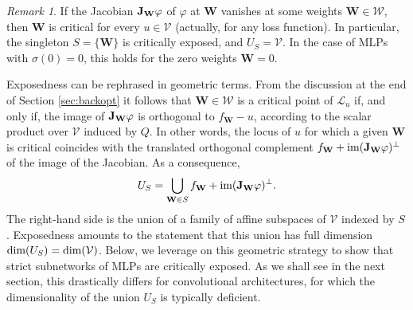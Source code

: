 \documentclass{article} %
\theoremstyle{plain}%
\theoremstyle{definition}
\theoremstyle{remark}
\newtheorem{rmk}{Remark}[section]
\newcommand{\jacob}{\textnormal{\textbf{J}}}
\begin{document}
\begin{rmk}\label{rem:vanexp}
If the Jacobian $\jacob_\mathbf{W}\varphi$  of $\varphi$ at $\mathbf{W}$  vanishes at some weights $\mathbf{W} \in \mathcal{W}$, then $\mathbf{W}$ is critical for every $u \in \mathcal{V}$ (actually, for any loss function). In particular, the singleton $S = \{ \mathbf{W} \}$ is critically exposed, and $U_S = \mathcal{V}$. In the case of MLPs with $\sigma(0) = 0$, this holds for the zero weights $\mathbf{W} = 0$.
\end{rmk}
Exposedness can be rephrased in geometric terms. From the discussion at the end of Section \ref{sec:backopt} it follows that $\mathbf{W} \in \mathcal{W}$ is a critical point of $\mathcal{L}_u$ if, and only if, the image of $\jacob_\mathbf{W}\varphi$ is orthogonal to $f_\mathbf{W} - u $, according to the scalar product over $\mathcal{V}$ induced by $Q$. In other words, the locus of $u$ for which a given $\mathbf{W}$ is critical coincides with the translated orthogonal complement $f_\mathbf{W} + \textnormal{im}( \jacob_\mathbf{W}\varphi)^\perp$ of the image of the Jacobian. As a consequence, 
\begin{equation}\label{eq:affamily}
U_S = \bigcup_{\mathbf{W} \in S} f_\mathbf{W} + \textnormal{im}( \jacob_\mathbf{W}\varphi)^\perp. 
\end{equation}
The right-hand side is the union of a family of affine subspaces of $\mathcal{V}$ indexed by $S$. Exposedness amounts to the statement that this union has full dimension $\textnormal{dim}(U_S) = \textnormal{dim}(\mathcal{V})$. Below, we leverage on this geometric strategy to show that strict subnetworks of MLPs are critically exposed. As we shall see in the next section, this drastically differs for convolutional architectures, for which the dimensionality of the union $U_S$ is typically deficient. 
\end{document}
